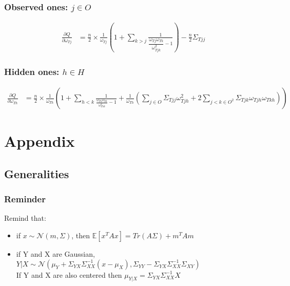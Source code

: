 \documentclass[11pt,a4paper]{article}
\newcommand{\Esp}{\mathds{E}}
\begin{document}
\subsubsection{Observed ones: $j\in O $}


\begin{align*}
\frac{\partial Q}{\partial \omega_{Tj}}  &= \frac{n}{2}\times \frac{1}{\omega_{Tj}}\left( 1 + \sum_{k>j} \frac{1}{\dfrac{\omega_{Tj}\omega_{Tk}}{\omega_{Tjk} ^2} - 1}  \right) -\frac{n}{2} \Sigma_{Tjj}
\end{align*}




\subsubsection{Hidden ones: $h\in H$}
\begin{align*}
\frac{\partial Q}{\partial \omega_{Th}}  &= \frac{n}{2}\times \frac{1}{\omega_{Th}}\left(1 + \sum_{h<k} \frac{1}{\frac{\omega_{Th}\omega_{Tk}}{\omega_{Thk}^2}-1} + \frac{1}{\omega_{Th}} \left(\sum_{j \in O} \Sigma_{Tjj}\omega_{Tjh}^2 + 2\sum_{j<k \in O^2} \Sigma_{Tjk} \omega_{Tjh}\omega_{Tkh}\right) \right) 
\end{align*}

\newpage
\section{Appendix}

\subsection{Generalities}


\subsubsection{Reminder}
Remind that:
\begin{itemize}
\item if $x\sim\mathcal{N}(m, \Sigma)$, then
$\Esp[x^TAx] = Tr(A\Sigma) + m^TAm$
\item if Y and X are Gaussian, $Y|X \sim \mathcal{N}(\mu_Y+\Sigma_{YX}\Sigma_{XX}^{-1}(x-\mu_X) , \Sigma_{YY} - \Sigma_{YX}\Sigma_{XX}^{-1}\Sigma_{XY})$\\
If Y and X are also centered then $\mu_{Y|X} = \Sigma_{YX}\Sigma_{XX}^{-1} X$
\end{itemize}
\end{document}
